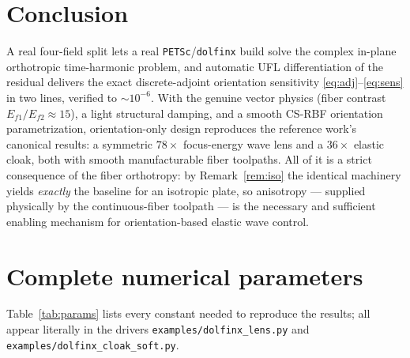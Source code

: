 \documentclass[11pt]{article}
\begin{document}
\section{Conclusion}
A real four-field split lets a real \texttt{PETSc}/\texttt{dolfinx} build solve
the complex in-plane orthotropic time-harmonic problem, and automatic UFL
differentiation of the residual delivers the exact discrete-adjoint orientation
sensitivity \eqref{eq:adj}--\eqref{eq:sens} in two lines, verified to
$\sim\!10^{-6}$. With the genuine vector physics (fiber contrast
$E_{f1}/E_{f2}\approx15$), a light structural damping, and a smooth CS-RBF
orientation parametrization, orientation-only design reproduces the reference
work's canonical results: a symmetric $78\times$ focus-energy wave lens and a $36\times$
elastic cloak, both with smooth manufacturable fiber toolpaths. All of it is a
strict consequence of the fiber orthotropy: by Remark~\ref{rem:iso} the identical
machinery yields \emph{exactly} the baseline for an isotropic plate, so
anisotropy --- supplied physically by the continuous-fiber toolpath --- is the
necessary and sufficient enabling mechanism for orientation-based elastic wave
control.

\appendix
\section{Complete numerical parameters}
\label{app:params}
Table~\ref{tab:params} lists every constant needed to reproduce the results; all
appear literally in the drivers \texttt{examples/dolfinx\_lens.py} and
\texttt{examples/dolfinx\_cloak\_soft.py}.
\end{document}

